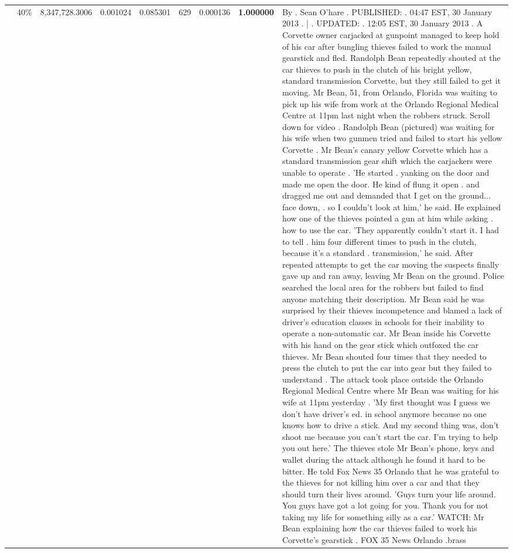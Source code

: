 \begin{table}[H]
\begin{tabular}{llrrrrrrl}
 & 40\% & 8,347,728.3006 & 0.001024 & 0.085301 & \color{red} 629 & 0.000136 & \bfseries \color{red} 1.000000 & By . Sean O'hare . PUBLISHED: . 04:47 EST, 30 January 2013 . | . UPDATED: . 12:05 EST, 30 January 2013 . A Corvette owner carjacked at gunpoint managed to keep hold of his car after bungling thieves failed to work the manual gearstick and fled. Randolph Bean repeatedly shouted at the car thieves to push in the clutch of his bright yellow, standard transmission Corvette, but they still failed to get it moving. Mr Bean, 51, from Orlando, Florida was waiting to pick up his wife from work at the Orlando Regional Medical Centre at 11pm last night when the robbers struck. Scroll down for video . Randolph Bean (pictured) was waiting for his wife when two gunmen tried and failed to start his yellow Corvette . Mr Bean's canary yellow Corvette which has a standard transmission gear shift which the carjackers were unable to operate . 'He started . yanking on the door and made me open the door. He kind of flung it open . and dragged me out and demanded that I get on the ground... face down, . so I couldn't look at him,' he said. He explained how one of the thieves pointed a gun at him while asking . how to use the car. 'They apparently couldn't start it. I had to tell . him four different times to push in the clutch, because it's a standard . transmission,' he said. After repeated attempts to get the car moving the suspects finally gave up and ran away, leaving Mr Bean on the ground. Police searched the local area for the robbers but failed to find anyone matching their description. Mr Bean said he was surprised by their thieves incompetence and blamed a lack of driver's education classes in schools for their inability to operate a non-automatic car. Mr Bean inside his Corvette with his hand on the gear stick which outfoxed the car thieves. Mr Bean shouted four times that they needed to press the clutch to put the car into gear but they failed to understand . The attack took place outside the Orlando Regional Medical Centre where Mr Bean was waiting for his wife at 11pm yesterday . 'My first thought was I guess we don't have driver's ed. in school anymore because no one knows how to drive a stick. And my second thing was, don't shoot me because you can't start the car. I'm trying to help you out here.' The thieves stole Mr Bean's phone, keys and wallet during the attack although he found it hard to be bitter. He told Fox News 35 Orlando that he was grateful to the thieves for not killing him over a car and that they should turn their lives around. 'Guys turn your life around. You guys have got a lot going for you. Thank you for not taking my life for something silly as a car.' WATCH: Mr Bean explaining how the car thieves failed to work his Corvette's gearstick . FOX 35 News Orlando .brass \\

\end{tabular}
\end{table}
